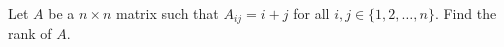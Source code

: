 Let \(A\) be a \(n\times n\) matrix such that \(A_{ij} = i+j\) for all \(i, j \in \{1, 2, \ldots, n\}\).
Find the rank of \(A\).